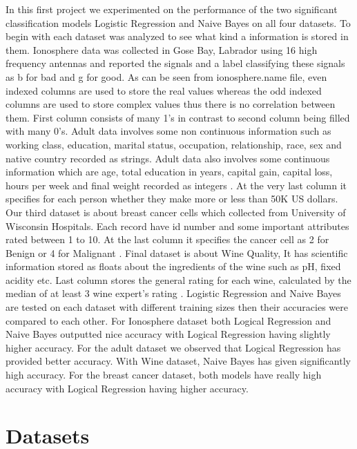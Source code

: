 \documentclass[conference]{IEEEtran}
\begin{document}
In this first project we experimented on the performance of the two significant classification models Logistic Regression and Naive Bayes on all four datasets. To begin with each dataset was analyzed to see what kind a information is stored in them. Ionosphere data was collected in Gose Bay, Labrador using 16 high frequency antennas and reported the signals and a label classifying these signals as b for bad and g for good. As can be seen from ionosphere.name file, even indexed columns are used to store the real values whereas the odd indexed columns are used to store complex values thus there is no correlation between them. First column consists of many 1's in contrast to second column being filled with many 0's.    \cite{ionosphere} Adult data involves some non continuous information such as working class, education, marital status, occupation, relationship, race, sex and native country recorded as strings. Adult data also involves some continuous information which are age, total education in years, capital gain, capital loss, hours per week and final weight recorded as integers \cite{adult}. At the very last column it specifies for each person whether they make more or less than 50K US dollars. Our third dataset is about breast cancer cells which collected from University of Wisconsin Hospitals. Each record have id number and some important attributes rated between 1 to 10. At the last column it specifies the cancer cell as 2 for Benign or 4 for Malignant \cite{cancer}. Final dataset is about Wine Quality, It has scientific information stored as floats about the ingredients of the wine such as pH, fixed acidity etc. Last column stores the general rating for each wine, calculated by the median of at least 3 wine expert's rating \cite{wine}. Logistic Regression and Naive Bayes are tested on each dataset with different training sizes then their accuracies were compared to each other. For Ionosphere dataset both Logical Regression and Naive Bayes outputted nice accuracy with Logical Regression having slightly higher accuracy. For the adult dataset we observed that Logical Regression has provided better accuracy. With Wine dataset, Naive Bayes has given significantly high accuracy. For the breast cancer dataset, both models have really high accuracy with Logical Regression having higher accuracy.



\section{Datasets}
\label{section:datasets}
\end{document}
